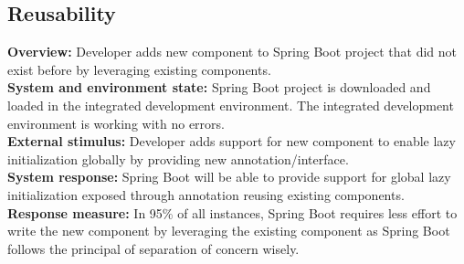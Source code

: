 \subsection*{Reusability}

\textbf{Overview:} Developer adds new component to Spring Boot project that did not exist before by leveraging existing components. \\

\textbf{System and environment state:} Spring Boot project is downloaded and loaded in the integrated development environment. The integrated development environment is working with no errors. \\

\textbf{External stimulus:} Developer adds support for new component to enable lazy initialization globally by providing new annotation/interface. \\

\textbf{System response:} Spring Boot will be able to provide support for global lazy initialization exposed through annotation reusing existing components. \\

\textbf{Response measure:} In 95\% of all instances, Spring Boot requires less effort to write the new component by leveraging the existing component as Spring Boot follows the principal of separation of concern wisely.